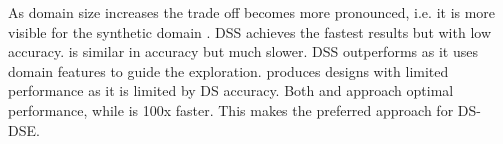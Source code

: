 As domain size increases the trade off becomes more pronounced, i.e. it is more visible for the synthetic domain . 
DSS achieves the fastest results but with low accuracy. \garand is similar in accuracy but much slower. DSS outperforms \garand as it uses domain features to guide the exploration. \gads produces designs with limited performance as it is limited by DS accuracy. Both \gah and \gaana approach optimal performance, while \gah is 100x faster. This makes \gah the preferred approach for DS-DSE.